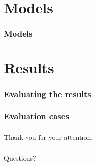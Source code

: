 \documentclass[18pt]{beamer}
\begin{document}
\section{Models}
\begin{frame}
  \frametitle{Models}  
\end{frame}

\section{Results}
\begin{frame}
  \frametitle{Evaluating the results}  
\end{frame}

\begin{frame}
  \frametitle{Evaluation cases}
\end{frame}

\begin{frame}
  \frametitle{}
  \begin{center}
    \huge{Thank you for your attention.}
  \end{center}
\end{frame}

\begin{frame}
  \frametitle{}
  \begin{center}
    \huge{Questions?}
  \end{center}
\end{frame}
\end{document}
